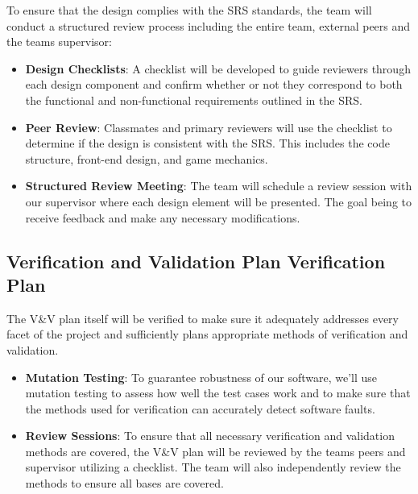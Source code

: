 \documentclass[12pt, titlepage]{article}
\begin{document}



\noindent To ensure that the design complies with the SRS standards, the team will conduct a structured review process including the entire team, external peers and the teams supervisor:

\begin{itemize}
    \item \textbf{Design Checklists}:  A checklist will be developed to guide reviewers through each design component and confirm whether or not they correspond to both the functional and non-functional requirements outlined in the SRS.
    \item \textbf{Peer Review}: Classmates and primary reviewers will use the checklist to determine if the design is consistent with the SRS. This includes the code structure, front-end design, and game mechanics. 
    \item \textbf{Structured Review Meeting}: The team will schedule a review session with our supervisor where each design element will be presented. The goal being to receive feedback and make any necessary modifications. 
\end{itemize}


\subsection{Verification and Validation Plan Verification Plan}




\noindent The V\&V plan itself will be verified to make sure it adequately addresses every facet of the project and sufficiently plans appropriate methods of verification and validation.

\begin{itemize}
  \item \textbf{Mutation Testing}: To guarantee robustness of our software, we'll use mutation testing to assess how well the test cases work and to make sure that the methods used for verification can accurately detect software faults.
  \item \textbf{Review Sessions}: To ensure that all necessary verification and validation methods are covered, the V\&V plan will be reviewed by the teams peers and supervisor utilizing a checklist. The team will also independently review the methods to ensure all bases are covered.
\end{itemize}
\end{document}
